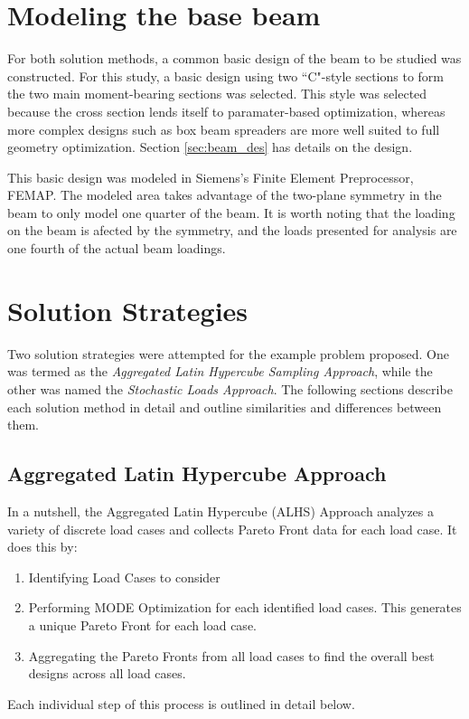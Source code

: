 \section{Modeling the base beam}
For both solution methods, a common basic design of the beam to be studied was constructed. For this study, a basic design using two ``C"-style sections to form the two main moment-bearing sections was selected. This style was selected because the cross section lends itself to paramater-based optimization, whereas more complex designs such as box beam spreaders are more well suited to full geometry optimization. Section \ref{sec:beam_des} has details on the design. 

This basic design was modeled in Siemens's Finite Element Preprocessor, FEMAP. The modeled area takes advantage of the two-plane symmetry in the beam to only model one quarter of the beam. It is worth noting that the loading on the beam is afected by the symmetry, and the loads presented for analysis are one fourth of the actual beam loadings. 

\section{Solution Strategies}
Two solution strategies were attempted for the example problem proposed. One was termed as the \emph{Aggregated Latin Hypercube Sampling Approach}, while the other was named the \emph{Stochastic Loads Approach}. The following sections describe each solution method in detail and outline similarities and differences between them. 

\subsection{Aggregated Latin Hypercube Approach}

In a nutshell, the Aggregated Latin Hypercube (ALHS) Approach analyzes a variety of discrete load cases and collects Pareto Front data for each load case. It does this by:

\begin{enumerate}
\item Identifying Load Cases to consider
\item Performing MODE Optimization for each identified load cases. This generates a unique Pareto Front for each load case. 
\item Aggregating the Pareto Fronts from all load cases to find the overall best designs across all load cases. 
\end{enumerate}
Each individual step of this process is outlined in detail below. 

